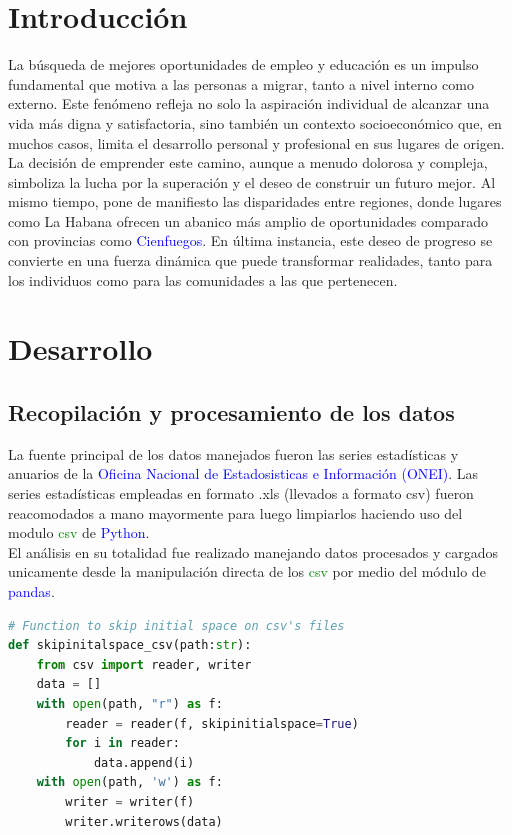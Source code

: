 \documentclass{article}
\begin{document}
\section{Introducción}
La búsqueda de mejores oportunidades de empleo y educación es un impulso fundamental que motiva a las personas a migrar, tanto a nivel interno como externo. Este fenómeno refleja no solo la aspiración individual de alcanzar una vida más digna y satisfactoria, sino también un contexto socioeconómico que, en muchos casos, limita el desarrollo personal y profesional en sus lugares de origen. La decisión de emprender este camino, aunque a menudo dolorosa y compleja, simboliza la lucha por la superación y el deseo de construir un futuro mejor. Al mismo tiempo, pone de manifiesto las disparidades entre regiones, donde lugares como La Habana ofrecen un abanico más amplio de oportunidades comparado con provincias como \textcolor{blue}{Cienfuegos}. En última instancia, este deseo de progreso se convierte en una fuerza dinámica que puede transformar realidades, tanto para los individuos como para las comunidades a las que pertenecen.


\section{Desarrollo}
\subsection{Recopilación y procesamiento de los datos}
La fuente principal de los datos manejados fueron las series estadísticas y anuarios de la \textcolor{blue}{Oficina Nacional de Estadosisticas e Información (ONEI)}. Las series estadísticas empleadas en formato .xls (llevados a formato csv) fueron reacomodados a mano mayormente para luego limpiarlos haciendo uso del modulo \textcolor{green}{csv} de \textcolor{blue}{Python}.\\ 
El análisis en su totalidad fue realizado manejando datos procesados y cargados unicamente desde la manipulación directa de los \textcolor{green}{csv} por medio del módulo de \textcolor{blue}{pandas}.

\begin{lstlisting}[language=Python, caption=Funcion para la limpieza de los csv (eliminar espacios adicionales)]
# Function to skip initial space on csv's files
def skipinitalspace_csv(path:str):
    from csv import reader, writer
    data = []
    with open(path, "r") as f:
        reader = reader(f, skipinitialspace=True)
        for i in reader:
            data.append(i)
    with open(path, 'w') as f:
        writer = writer(f)
        writer.writerows(data)
\end{lstlisting}
\end{document}
